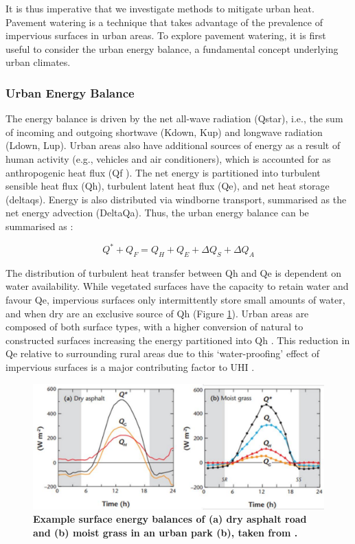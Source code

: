 \documentclass[final,3p,times,authoryear]{elsarticle}
\begin{document}
It is thus imperative that we investigate methods to mitigate urban heat. Pavement
watering is a technique that takes advantage of the prevalence of impervious surfaces in
urban areas. To explore pavement watering, it is first useful to consider the urban
energy balance, a fundamental concept underlying urban climates.

\subsubsection{Urban Energy Balance}\label{sec:appendix7.1.2.1}

The energy balance is driven by the net all-wave radiation (\gls{Qstar}), i.e., the sum of
incoming and outgoing shortwave (\gls{Kdown}, \gls{Kup}) and longwave radiation (\gls{Ldown}, \gls{Lup}). Urban areas also have additional sources of energy as a result of human activity (e.g., vehicles and air conditioners), which is accounted for as anthropogenic heat flux (\gls{Qf} ). The net energy is partitioned into turbulent sensible heat flux (\gls{Qh}), turbulent latent heat flux (\gls{Qe}), and net heat storage (\gls{deltaqs}). Energy is also distributed via windborne transport, summarised as the net energy advection (\gls{DeltaQa}). Thus, the urban energy
balance can be summarised as \citep{Oke1988,Grimmond2010}:

\begin{equation}
Q^{*} + Q_{F} = Q_{H} + Q_{E} + \Delta Q_{S} + \Delta Q_{A}
\label{eq:7.1} 
\end{equation}

The distribution of turbulent heat transfer between \gls{Qh} and \gls{Qe} is dependent on water availability. While vegetated surfaces have the capacity to retain water and favour \gls{Qe}, impervious surfaces only intermittently store small amounts of water, and when dry are an exclusive source of \gls{Qh} (Figure \ref{fig:7.1}). Urban areas are composed of both surface types, with a higher conversion of natural to constructed surfaces increasing the energy partitioned into \gls{Qh} \citep{Oke2017}. This reduction in \gls{Qe} relative to surrounding rural areas due to this `water-proofing' effect of impervious surfaces is a major contributing factor to UHI \citep{Oke1982}.

\begin{figure}
\centering
\includegraphics[trim={0 0 0 0},clip,scale=0.8]{SEB.png}
\caption{\bf Example surface energy balances of (a) dry asphalt road and (b) moist grass in an urban park (b), taken from \cite{Oke2017}.}
 \label{fig:7.1}
\end{figure}
\end{document}

